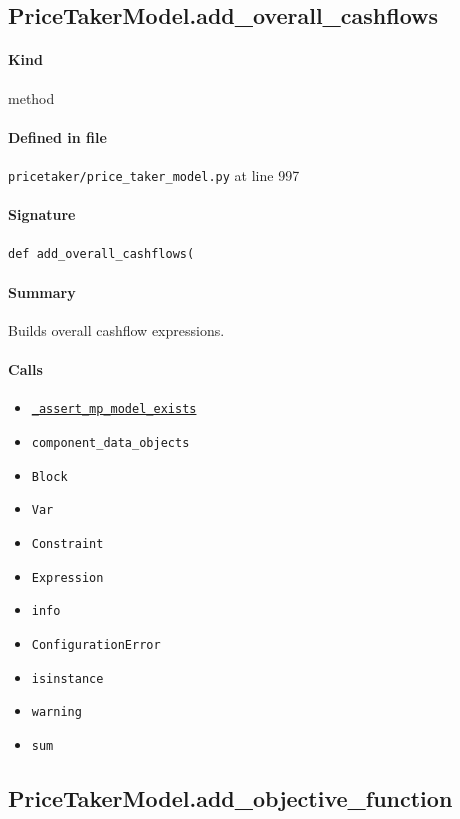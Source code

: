\documentclass[11pt]{report}
\begin{document}
\subsection{PriceTakerModel.add\_overall\_cashflows}
\label{def:pricetaker-price_taker_model.py:PriceTakerModel.add_overall_cashflows:L997}
\paragraph{Kind} method
\paragraph{Defined in file} \texttt{pricetaker/price\_taker\_model.py} at line 997
\paragraph{Signature} \texttt{def add\_overall\_cashflows(}
\paragraph{Summary} Builds overall cashflow expressions.
\paragraph{Calls}
\begin{itemize}[leftmargin=*]
  \item \hyperref[def:pricetaker-price_taker_model.py:PriceTakerModel._assert_mp_model_exists:L283]{\texttt{\_assert\_mp\_model\_exists}}
  \item \texttt{component\_data\_objects}
  \item \texttt{Block}
  \item \texttt{Var}
  \item \texttt{Constraint}
  \item \texttt{Expression}
  \item \texttt{info}
  \item \texttt{ConfigurationError}
  \item \texttt{isinstance}
  \item \texttt{warning}
  \item \texttt{sum}
\end{itemize}
\subsection{PriceTakerModel.add\_objective\_function}
\label{def:pricetaker-price_taker_model.py:PriceTakerModel.add_objective_function:L1123}
\end{document}
